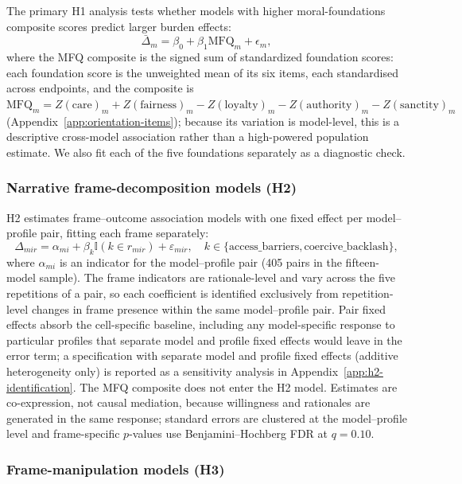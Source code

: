 \documentclass[12pt,a4paper]{article}
\begin{document}
The primary H1 analysis tests whether models with higher moral-foundations composite scores predict larger burden effects:
\[
\bar{\Delta}_m = \beta_0 + \beta_1 \text{MFQ}_m + \epsilon_m,
\]
where the MFQ composite is the signed sum of standardized foundation scores: each foundation score is the unweighted mean of its six items, each standardised across endpoints, and the composite is \(\mathrm{MFQ}_m = Z(\mathrm{care})_m + Z(\mathrm{fairness})_m - Z(\mathrm{loyalty})_m - Z(\mathrm{authority})_m - Z(\mathrm{sanctity})_m\) (Appendix~\ref{app:orientation-items}); because its variation is model-level, this is a descriptive cross-model association rather than a high-powered population estimate. We also fit each of the five foundations separately as a diagnostic check.

\subsubsection{Narrative frame-decomposition models (H2)}
\label{sec:est-h2}

H2 estimates frame--outcome association models with one fixed effect per model--profile pair, fitting each frame separately:
\[
\Delta_{mir} = \alpha_{mi} + \beta_k \mathbb{I}(k \in r_{mir}) + \varepsilon_{mir}, \quad k \in \{\text{access\_barriers}, \text{coercive\_backlash}\},
\]
where \(\alpha_{mi}\) is an indicator for the model--profile pair (405 pairs in the fifteen-model sample). The frame indicators are rationale-level and vary across the five repetitions of a pair, so each coefficient is identified exclusively from repetition-level changes in frame presence within the same model--profile pair. Pair fixed effects absorb the cell-specific baseline, including any model-specific response to particular profiles that separate model and profile fixed effects would leave in the error term; a specification with separate model and profile fixed effects (additive heterogeneity only) is reported as a sensitivity analysis in Appendix~\ref{app:h2-identification}. The MFQ composite does not enter the H2 model. Estimates are co-expression, not causal mediation, because willingness and rationales are generated in the same response; standard errors are clustered at the model--profile level and frame-specific \(p\)-values use Benjamini--Hochberg FDR at \(q=0.10\).

\subsubsection{Frame-manipulation models (H3)}
\label{sec:est-h3}
\end{document}
